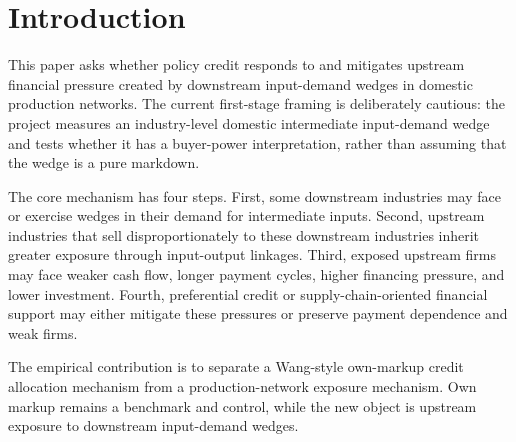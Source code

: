 \section{Introduction}

This paper asks whether policy credit responds to and mitigates upstream financial pressure created by downstream input-demand wedges in domestic production networks. The current first-stage framing is deliberately cautious: the project measures an industry-level domestic intermediate input-demand wedge and tests whether it has a buyer-power interpretation, rather than assuming that the wedge is a pure markdown.

The core mechanism has four steps. First, some downstream industries may face or exercise wedges in their demand for intermediate inputs. Second, upstream industries that sell disproportionately to these downstream industries inherit greater exposure through input-output linkages. Third, exposed upstream firms may face weaker cash flow, longer payment cycles, higher financing pressure, and lower investment. Fourth, preferential credit or supply-chain-oriented financial support may either mitigate these pressures or preserve payment dependence and weak firms.

The empirical contribution is to separate a Wang-style own-markup credit allocation mechanism from a production-network exposure mechanism. Own markup remains a benchmark and control, while the new object is upstream exposure to downstream input-demand wedges.
